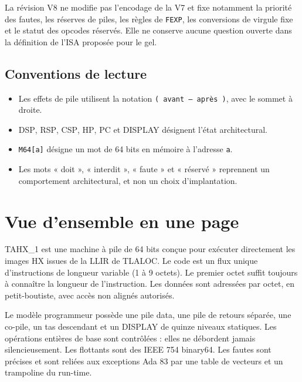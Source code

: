 \documentclass[10pt,a4paper,twoside,openany]{book}
\newcommand{\code}[1]{\texttt{#1}}
\newcommand{\stack}[1]{\texttt{#1}}
\newcommand{\reg}[1]{\textsc{#1}}
\begin{document}
La révision V8 ne modifie pas l'encodage de la V7 et fixe notamment la priorité des fautes, les réserves de piles, les règles de \texttt{FEXP}, les conversions de virgule fixe et le statut des opcodes réservés. Elle ne conserve aucune question ouverte dans la définition de l'ISA proposée pour le gel.

\section*{Conventions de lecture}
\begin{itemize}
\item Les effets de pile utilisent la notation \stack{( avant -- après )}, avec le sommet à droite.
\item \reg{DSP}, \reg{RSP}, \reg{CSP}, \reg{HP}, \reg{PC} et \reg{DISPLAY} désignent l'état architectural.
\item \code{M64[a]} désigne un mot de 64 bits en mémoire à l'adresse \code{a}.
\item Les mots « doit », « interdit », « faute » et « réservé » reprennent un comportement architectural, et non un choix d'implantation.
\end{itemize}

\chapter*{Vue d'ensemble en une page}
TAHX\_1 est une machine à pile de 64 bits conçue pour exécuter directement les images HX issues de la LLIR de TLALOC. Le code est un flux unique d'instructions de longueur variable (1 à 9 octets). Le premier octet suffit toujours à connaître la longueur de l'instruction. Les données sont adressées par octet, en petit-boutiste, avec accès non alignés autorisés.

Le modèle programmeur possède une pile data, une pile de retours séparée, une co-pile, un tas descendant et un \reg{DISPLAY} de quinze niveaux statiques. Les opérations entières de base sont contrôlées : elles ne débordent jamais silencieusement. Les flottants sont des IEEE 754 binary64. Les fautes sont précises et sont reliées aux exceptions Ada 83 par une table de vecteurs et un trampoline du run-time.
\end{document}
